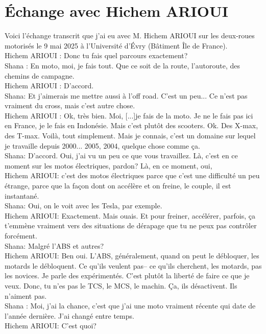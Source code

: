 \section{Échange avec Hichem ARIOUI}
\label{echangeArioui}
Voici l'échange transcrit que j'ai eu avec M. Hichem ARIOUI sur les deux-roues motorisés le 9 mai 2025 à l'Université d'Évry (Bâtiment Île de France). \\
Hichem ARIOUI : Donc tu fais quel parcours exactement? \\
Shana : En moto, moi, je fais tout. Que ce soit de la route, l'autoroute, des chemins de campagne.\\
Hichem ARIOUI : D'accord. \\
Shana: Et j'aimerais me mettre aussi à l'off road. C'est un peu... Ce n'est pas vraiment du cross, mais c'est autre chose. \\
Hichem ARIOUI : Ok, très bien. Moi, [...]je fais de la moto. Je ne le fais pas ici en France, je le fais en Indonésie. Mais c'est plutôt des scooters. Ok. Des X-max, des T-max. Voilà, tout simplement. Mais je connais, c'est un domaine sur lequel je travaille depuis 2000... 2005, 2004, quelque chose comme ça. \\
Shana: D'accord. Oui, j'ai vu un peu ce que vous travaillez. Là, c'est en ce moment sur les motos électriques, pardon? Là, en ce moment, oui, \\
Hichem ARIOUI: c'est des motos électriques parce que c'est une difficulté un peu étrange, parce que la façon dont on accélère et on freine, le couple, il est instantané. \\
Shana: Oui, on le voit avec les Tesla, par exemple. \\
Hichem ARIOUI: Exactement. Mais ouais. Et pour freiner, accélérer, parfois, ça t'emmène vraiment vers des situations de dérapage que tu ne peux pas contrôler forcément. \\
Shana: Malgré l'ABS et autres? \\
Hichem ARIOUI: Ben oui. L'ABS, généralement, quand on peut le débloquer, les motards le débloquent. Ce qu'ils veulent pas-- ce qu'ils cherchent, les motards, pas les novices. Je parle des expérimentés. C'est plutôt la liberté de faire ce que je veux. Donc, tu n'es pas le TCS, le MCS, le machin. Ça, ils désactivent. Ils n'aiment pas. \\
Shana : Moi, j'ai la chance, c'est que j'ai une moto vraiment récente qui date de l'année dernière. J'ai changé entre temps. \\
Hichem ARIOUI: C'est quoi? \\
